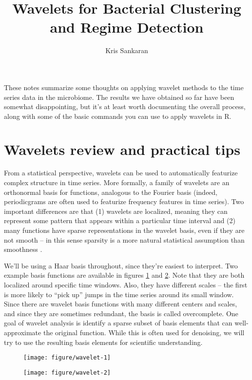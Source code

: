 \documentclass{article}
\title{Wavelets for Bacterial Clustering and Regime Detection}
\author{Kris Sankaran}
\begin{document}
\maketitle

These notes summarize some thoughts on applying wavelet methods to the
time series data in the microbiome. The results we have obtained so far have
been somewhat disappointing, but it's at least worth documenting the overall
process, along with some of the basic commands you can use to apply wavelets in
R.

\section{Wavelets review and practical tips}

From a statistical perspective, wavelets can be used to automatically featurize
complex structure in time series. More formally, a family of wavelets are an
orthonormal basis for functions, analogous to the Fourier basis (indeed,
periodicgrams are often used to featurize frequency features in time series).
Two important differences are that (1) wavelets are localized, meaning they can
represent some pattern that appears within a particular time interval and (2)
many functions have sparse representations in the wavelet basis, even if they
are not smooth -- in this sense sparsity is a more natural statistical
assumption than smoothness \citep{johnstone2011gaussian}.

We'll be using a Haar basis throughout, since they're easiest to interpret. Two
example basis functions are available in figures \ref{fig:wavelet-1} and
\ref{fig:wavelet-2}. Note that they are both localized around specific time
windows. Also, they have different scales -- the first is more likely to ``pick
up'' jumps in the time series around its small window. Since there are wavelet
basis functions with many different centers and scales, and since they are
sometimes redundant, the basis is called overcomplete. One goal of wavelet
analysis is identify a sparse subset of basis elements that can well-approximate
the original function. While this is often used for denoising, we will try to
use the resulting basis elements for scientific understanding.

\begin{figure}[ht]
  \centering
  \texttt{[image: figure/wavelet-1]}
  \caption{\label{fig:wavelet-1}}
\end{figure}

\begin{figure}[ht]
  \centering
  \texttt{[image: figure/wavelet-2]}
  \caption{\label{fig:wavelet-2}}
\end{figure}
\end{document}
